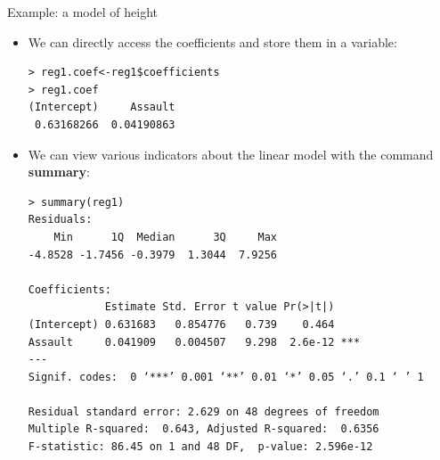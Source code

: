 \documentclass[handout]{beamer}
\begin{document}
\begin{frame}[fragile]{Example: a model of height}
\scriptsize{
\begin{itemize}
 \item We can directly access the coefficients and store them in a variable:
 \begin{verbatim}
> reg1.coef<-reg1$coefficients
> reg1.coef
(Intercept)     Assault 
 0.63168266  0.04190863 
 \end{verbatim}
 
\item We can view various indicators about the linear model with the command \textbf{summary}:
 
\begin{verbatim}
> summary(reg1)
Residuals:
    Min      1Q  Median      3Q     Max 
-4.8528 -1.7456 -0.3979  1.3044  7.9256 

Coefficients:
            Estimate Std. Error t value Pr(>|t|)    
(Intercept) 0.631683   0.854776   0.739    0.464    
Assault     0.041909   0.004507   9.298  2.6e-12 ***
---
Signif. codes:  0 ‘***’ 0.001 ‘**’ 0.01 ‘*’ 0.05 ‘.’ 0.1 ‘ ’ 1

Residual standard error: 2.629 on 48 degrees of freedom
Multiple R-squared:  0.643,	Adjusted R-squared:  0.6356 
F-statistic: 86.45 on 1 and 48 DF,  p-value: 2.596e-12

\end{verbatim}
 
 \end{itemize}
 
 


} 
\end{frame}
\end{document}
